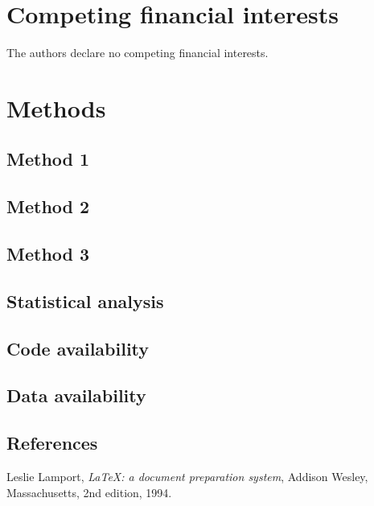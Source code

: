 \documentclass[twocolumn, linenumbers, superscriptaddress]{revtex4-1}
\begin{document}
	\section*{Competing financial interests}
		The authors declare no competing financial interests.
	
	\newpage

	\section*{Methods}
		\subsection*{Method 1}
			
		\subsection*{Method 2}

		\subsection*{Method 3}
			
		\subsection*{Statistical analysis}
			
		\subsection*{Code availability}
			
		\subsection*{Data availability}

	\begin{thebibliography}{50}
		\section*{References}	
			Leslie Lamport,
			\textit{\LaTeX: a document preparation system},
			Addison Wesley, Massachusetts,
			2nd edition,
			1994.

	\end{thebibliography}
\end{document}
